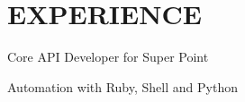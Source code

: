 \documentclass[letterpaper]{deedy-resume} %
\begin{document}
\hfill
%
%
\begin{minipage}[t]{0.66\textwidth} %
\section{EXPERIENCE}
\vspace{\topsep} %
\begin{tightitemize}
\item Core API Developer for Super Point \\
\item Automation with Ruby, Shell and Python \\
\end{tightitemize}
\sectionspace %

\end{minipage}
\end{document}
